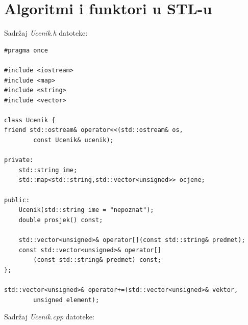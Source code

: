 \chapter{Algoritmi i funktori u STL-u}


Sadržaj \textit{Ucenik.h} datoteke:

\begin{verbatim}
#pragma once

#include <iostream>
#include <map>
#include <string>
#include <vector>

class Ucenik {
friend std::ostream& operator<<(std::ostream& os,
        const Ucenik& ucenik);
    
private: 
    std::string ime;
    std::map<std::string,std::vector<unsigned>> ocjene;

public:
    Ucenik(std::string ime = "nepoznat");
    double prosjek() const;

    std::vector<unsigned>& operator[](const std::string& predmet);
    const std::vector<unsigned>& operator[]
        (const std::string& predmet) const;
};

std::vector<unsigned>& operator+=(std::vector<unsigned>& vektor, 
        unsigned element);
\end{verbatim}

Sadržaj \textit{Ucenik.cpp} datoteke:

